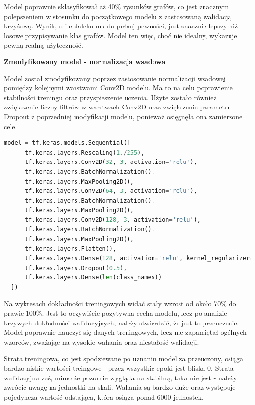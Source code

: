Model poprawnie sklasyfikował aż 40\% rysunków grafów,
co jest znacznym polepszeniem w stosunku do początkowego modelu z zastosowaną walidacją krzyżową.
Wynik, o ile daleko mu do pełnej pewności, jest znacznie lepszy niż losowe przypisywanie klas grafów.
Model ten więc, choć nie idealny, wykazuje pewną realną użyteczność.

\textbf{Zmodyfikowany model - normalizacja wsadowa}

Model został zmodyfikowany poprzez zastosowanie normalizacji wsadowej pomiędzy kolejnymi warstwami Conv2D modelu.
Ma to na celu poprawienie stabilności treningu oraz przyspieszenie uczenia.
Użyte zostało również zwiększenie liczby filtrów w warstwach Conv2D oraz zwiększenie parametru Dropout
z poprzedniej modyfikacji modelu, ponieważ osięgnęła ona zamierzone cele.

\begin{lstlisting}[language=Python,caption=Listing zmodyfikowanego skryptu tworzącego model z walidacją krzyżową - wersja 2,
	label={tests-model-crossval2}]
	model = tf.keras.models.Sequential([
      tf.keras.layers.Rescaling(1./255),
      tf.keras.layers.Conv2D(32, 3, activation='relu'),
      tf.keras.layers.BatchNormalization(),
      tf.keras.layers.MaxPooling2D(),
      tf.keras.layers.Conv2D(64, 3, activation='relu'),
      tf.keras.layers.BatchNormalization(),
      tf.keras.layers.MaxPooling2D(),
      tf.keras.layers.Conv2D(128, 3, activation='relu'),
      tf.keras.layers.BatchNormalization(),
      tf.keras.layers.MaxPooling2D(),
      tf.keras.layers.Flatten(),
      tf.keras.layers.Dense(128, activation='relu', kernel_regularizer=tf.keras.regularizers.l2(0.01)),
      tf.keras.layers.Dropout(0.5),
      tf.keras.layers.Dense(len(class_names))
  ])
\end{lstlisting}

Na wykresach dokładności treningowych widać stały wzrost od około 70\% do prawie 100\%.
Jest to oczywiście pozytywna cecha modelu, lecz po analizie krzywych dokładności walidacyjnych,
należy stwierdzić, że jest to przeuczenie. Model poprawnie nauczył się danych treningowych,
lecz nie zapamiętał ogólnych wzorców, zważając na wysokie wahania oraz niestałość walidacji.

Strata treningowa, co jest spodziewane po uznaniu model za przeuczony,
osiąga bardzo niskie wartości treingowe - przez wszystkie epoki jest bliska 0.
Strata walidacyjna zaś, mimo że pozornie wygląda na stabilną, taka nie jest
- należy zwrócić uwagę na jednostki na skali. Wahania są bardzo duże oraz występuje pojedyncza wartość odstająca,
która osiąga ponad 6000 jednostek.

